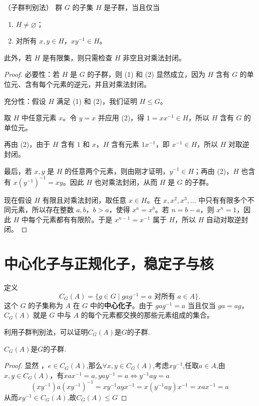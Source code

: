 \begin{proposition}
	（子群判别法） 群 $G$ 的子集 $H$ 是子群，当且仅当
\begin{enumerate}[label=(\arabic*)]
	\item $H\neq\varnothing$；
	\item 对所有 $x,y\in H$，$xy^{-1}\in H$。
\end{enumerate}
此外，若 $H$ 是有限集，则只需检查 $H$ 非空且对乘法封闭。
\end{proposition}
\begin{proof}
	必要性：若 $H$ 是 $G$ 的子群，则 (1) 和 (2) 显然成立，因为 $H$ 含有 $G$ 的单位元、含有每个元素的逆元，并且对乘法封闭。
	
	充分性：假设 $H$ 满足 (1) 和 (2)，我们证明 $H\leq G$。
	
	取 $H$ 中任意元素 $x$。令 $y=x$ 并应用 (2)，得 $1=xx^{-1}\in H$，所以 $H$ 含有 $G$ 的单位元。
	
	再由 (2)，由于 $H$ 含有 $1$ 和 $x$，$H$ 含有元素 $1x^{-1}$，即 $x^{-1}\in H$，所以 $H$ 对取逆封闭。
	
	最后，若 $x,y$ 是 $H$ 的任意两个元素，则由刚才证明，$y^{-1}\in H$；再由 (2)，$H$ 也含有 $x(y^{-1})^{-1}=xy$。因此 $H$ 也对乘法封闭，从而 $H$ 是 $G$ 的子群。
	
	现在假设 $H$ 有限且对乘法封闭，取任意 $x\in H$。在 $x,x^2,x^3,\ldots$ 中只有有限多个不同元素，所以存在整数 $a,b$，$b>a$，使得 $x^a=x^b$。若 $n=b-a$，则 $x^n=1$，因此 $H$ 中每个元素都有有限阶。于是 $x^{n-1}=x^{-1}$ 属于 $H$，所以 $H$ 自动对取逆封闭。
\end{proof}
\section{中心化子与正规化子，稳定子与核}
\begin{definition}
	定义
	\[
	C_G(A)=\{g\in G\mid gag^{-1}=a\text{ 对所有 }a\in A\}.
	\]
	这个 $G$ 的子集称为 $A$ 在 $G$ 中的\textbf{中心化子}。由于 $gag^{-1}=a$ 当且仅当 $ga=ag$，$C_G(A)$ 就是 $G$ 中与 $A$ 的每个元素都交换的那些元素组成的集合。
\end{definition}
利用子群判别法，可以证明$C_G(A)$是$G$的子群.
\begin{proposition}
	$C_G(A)$是$G$的子群.
\end{proposition}
\begin{proof}
	显然 ，$e\in C_G(A)$,那么$\forall x,y\in C_G(A)$,考虑$xy^{-1}$,任取$a\in A $,由 $x,y\in C_G(A)$，有$xax^{-1} = a ,yay^{-1} = a \iff y^{-1}a y = a$
	\[(xy^{-1})a(xy^{-1})^{-1}  = xy^{-1}a y x^{-1} = x(y^{-1}a y )x^{-1} = xax^{-1} =a\]
	从而$xy^{-1}\in  C_G(A)$,故$ C_G(A)\leqslant G$
\end{proof}

